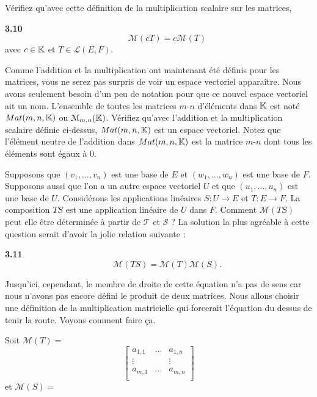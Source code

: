 \documentclass[12pt]{book}
\begin{document}
Vérifiez qu'avec cette définition de la multiplication scalaire sur les matrices,

\textbf{3.10}
\begin{equation*}
    \qquad \mathcal{M}(cT)=c\mathcal{M}(T)
\end{equation*}
avec $c\in\mathbb{K}$ et $T\in\mathcal{L}(E,F)$.

Comme l'addition et la multiplication ont maintenant été définis pour les matrices, vous ne serez pas surpris de voir un espace vectoriel apparaître. Nous avons seulement besoin d'un peu de notation pour que ce nouvel espace vectoriel ait un nom. L'ensemble de toutes les matrices $m$-$n$ d'éléments dans $\mathbb{K}$ est noté $Mat(m,n,\mathbb{K})$ ou $\mathcal{M}_{m,n}(\mathbb{K})$. Vérifiez qu'avec l'addition et la multiplication scalaire définie ci-dessus, $Mat(m,n,\mathbb{K})$ est un espace vectoriel. Notez que l'élément neutre de l'addition dans $Mat(m,n,\mathbb{K})$ est la matrice $m$-$n$ dont tous les éléments sont égaux à 0.
\linebreak

Supposons que $(v_1,\ldots,v_n)$ est une base de $E$ et $(w_1,\ldots,w_n)$ est une base de $F$. Supposons aussi que l'on a un autre espace vectoriel $U$ et que $(u_1,\ldots,u_n)$ est une base de $U$. Considérons les applications linéaires $S\colon U\rightarrow E$ et $T\colon E\rightarrow F$. La composition $TS$ est une application linéaire de $U$ dans $F$. Comment $\mathcal{M}(TS)$ peut elle être déterminée à partir de $\mathcal{T}$ et $\mathcal{S}$ ? La solution la plus agréable à cette question serait d'avoir la jolie relation suivante :

\textbf{3.11}
\begin{equation*}
    \qquad \mathcal{M}(TS)=\mathcal{M}(T)\mathcal{M}(S).
\end{equation*}

Jusqu'ici, cependant, le membre de droite de cette équation n'a pas de sens car nous n'avons pas encore défini le produit de deux matrices. Nous allons choisir une définition de la multiplication matricielle qui forcerait l'équation du dessus de tenir la route. Voyons comment faire ça.

Soit 
$\mathcal{M}(T)=$
\begin{equation*}\begin{bmatrix}
    a_{1,1} & \ldots & a_{1,n} \\
    \vdots & & \vdots\\
    a_{m,1} & \ldots & a_{m,n} \\
\end{bmatrix}\end{equation*}
et
$\mathcal{M}(S)=$
\end{document}
